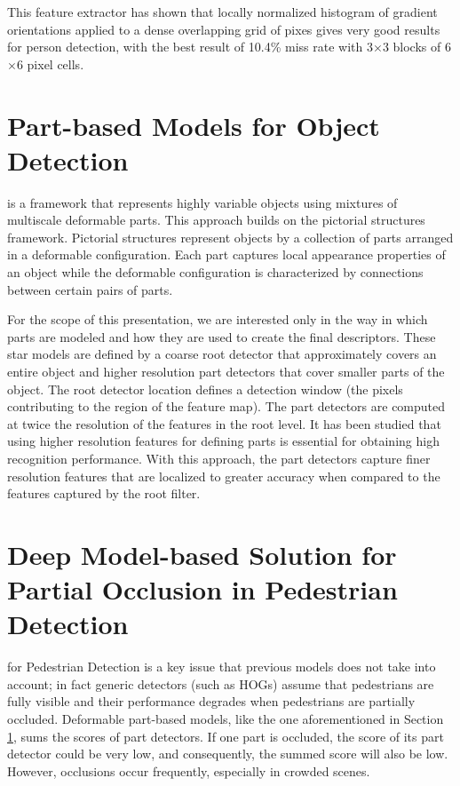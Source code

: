 \documentclass[10pt,journal,compsoc]{IEEEtran}
\begin{document}
This feature extractor has shown that
locally normalized histogram of gradient orientations applied to a dense overlapping
grid of pixes gives very good results for person detection, with the best result of
10.4\% miss rate with 3$\times$3 blocks of 6$\times$6 pixel cells.


\section{Part-based Models for Object Detection}
\label{sec:part_based_model}
 is a framework that represents highly variable
objects using mixtures of multiscale deformable parts.
This approach builds on the pictorial structures framework. Pictorial structures
represent objects by a collection of parts arranged in a deformable configuration.
Each part captures local appearance properties of an object while the deformable
configuration is characterized by connections between certain pairs of parts.

For the scope of this presentation, we are interested only in the way in which parts
are modeled and how they are used to create the final descriptors.
These star models are defined by a coarse root detector that approximately covers an
entire object and higher resolution part detectors that cover smaller parts of the
object. The root detector location defines a detection window (the pixels contributing to
the region of the feature map). The part detectors are computed at twice the resolution
of the features in the root level.
It has been studied that using higher resolution features for defining parts is essential
for obtaining high recognition performance. With this approach, the part detectors
capture finer resolution features that are localized to greater accuracy when
compared to the features captured by the root filter.




\section{Deep Model-based Solution for Partial Occlusion in Pedestrian Detection}
\label{sec:Occ}
 for Pedestrian Detection is a key issue that previous models
does not take into account; in fact generic detectors (such as HOGs) assume that
pedestrians are fully visible and their performance degrades when pedestrians are
partially occluded. Deformable part-based models, like the one aforementioned in
Section \ref{sec:part_based_model}, sums the scores of part detectors.
If one part is occluded, the score of its part detector could be very low, and
consequently, the summed score will also be low.
However, occlusions occur frequently, especially in crowded scenes.
\end{document}
